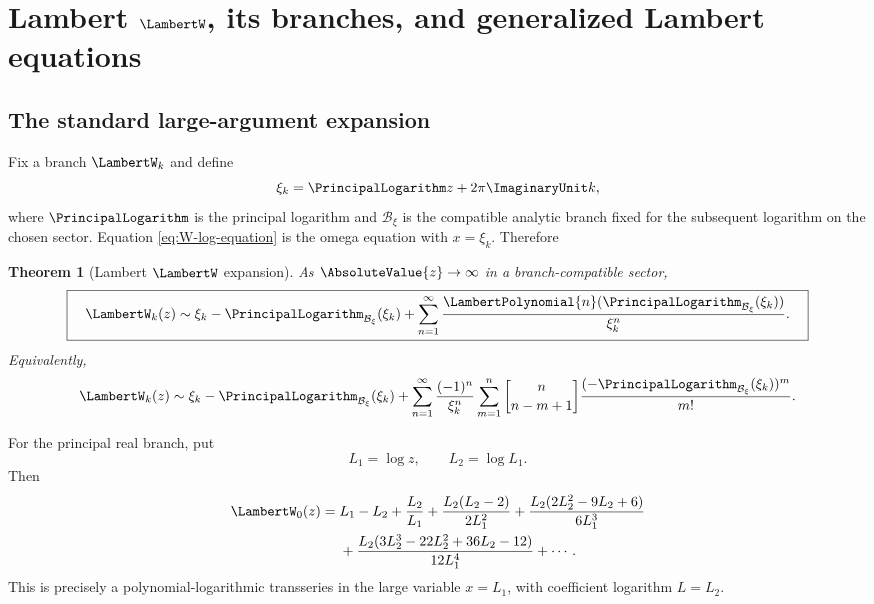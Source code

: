 \documentclass[11pt]{article}
\theoremstyle{pltheorem}
\newtheorem{theorem}{Theorem}[section]
\newcommand{\stirlingone}[2]{\genfrac{[}{]}{0pt}{}{#1}{#2}}
\newcommand{\LogarithmOnBranch}[2]{%
  \PrincipalLogarithm_{#1}\!\left(#2\right)%
}
\begin{document}
\section{\texorpdfstring{Lambert \(\LambertW\), its branches, and generalized Lambert equations}{Lambert W, its branches, and generalized Lambert equations}}
\label{sec:Lambert-W}

\subsection{The standard large-argument expansion}

Fix a branch \(\LambertW_k\) and define
\begin{equation}\label{eq:xi-k}
 \xi_k=\PrincipalLogarithm z+2\pi\ImaginaryUnit k,
\end{equation}
where \(\PrincipalLogarithm\) is the principal logarithm and
\(\mathcal B_\xi\) is the compatible analytic branch fixed for the
subsequent logarithm on the chosen sector.  Equation
\cref{eq:W-log-equation} is the omega equation with \(x=\xi_k\).  Therefore
\begin{theorem}[Lambert \(\LambertW\) expansion]\label{thm:W-expansion}
As \(\AbsoluteValue{z}\to\infty\) in a branch-compatible sector,
\begin{equation}\label{eq:W-expansion-P}
 \boxed{\quad
 \LambertW_k(z)\sim \xi_k-\LogarithmOnBranch{\mathcal B_\xi}{\xi_k}
 +\sum_{n=1}^{\infty}
 \frac{\LambertPolynomial{n}(\LogarithmOnBranch{\mathcal B_\xi}{\xi_k})}{\xi_k^n}.
 \quad}
\end{equation}
Equivalently,
\begin{equation}\label{eq:W-expansion-Stirling}
 \LambertW_k(z)\sim\xi_k-\LogarithmOnBranch{\mathcal B_\xi}{\xi_k}
 +\sum_{n=1}^{\infty}\frac{(-1)^n}{\xi_k^n}
 \sum_{m=1}^{n}\stirlingone{n}{n-m+1}
 \frac{(-\LogarithmOnBranch{\mathcal B_\xi}{\xi_k})^m}{m!}.
\end{equation}
\end{theorem}

For the principal real branch, put
\begin{equation}\label{eq:L1-L2}
 L_1=\log z,
 \qquad
 L_2=\log L_1.
\end{equation}
Then
\begin{align}
 \LambertW_0(z)={}&L_1-L_2+\frac{L_2}{L_1}
 +\frac{L_2(L_2-2)}{2L_1^2}
 +\frac{L_2(2L_2^2-9L_2+6)}{6L_1^3}
 \notag\\
 &+\frac{L_2(3L_2^3-22L_2^2+36L_2-12)}{12L_1^4}
 +\cdots.
 \label{eq:W-first-terms}
\end{align}
This is precisely a polynomial-logarithmic transseries in the large variable \(x=L_1\), with coefficient logarithm \(L=L_2\).
\end{document}
